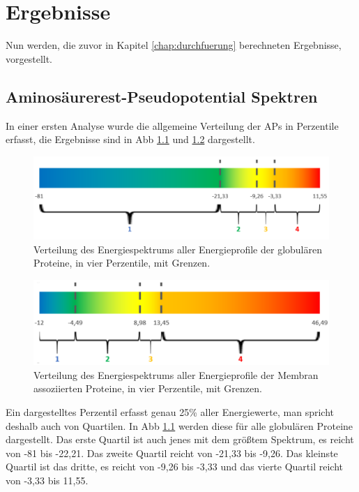 \chapter{Ergebnisse}
\label{chap:ergebnisse}

Nun werden, die zuvor in Kapitel \ref{chap:durchfuerung} berechneten Ergebnisse, vorgestellt.


\section{Aminosäurerest-Pseudopotential Spektren}

In einer ersten Analyse wurde die allgemeine Verteilung der \ac{APs} in Perzentile erfasst, die Ergebnisse sind in \ac{Abb} \ref{fig:quartiles_glob} und \ref{fig:quartiles_memb} dargestellt. 

\begin{figure}
\centering
\includegraphics[width=.95\textwidth]{images/Quartil_glob.png}
\caption{Verteilung des Energiespektrums aller Energieprofile der globulären Proteine, in vier Perzentile, mit Grenzen.}
\label{fig:quartiles_glob}
\end{figure}

\begin{figure}
\centering
\includegraphics[width=.95\textwidth]{images/Quartil_memb.png}
\caption{Verteilung des Energiespektrums aller Energieprofile der Membran assoziierten Proteine, in vier Perzentile, mit Grenzen.}
\label{fig:quartiles_memb}
\end{figure}


Ein dargestelltes Perzentil erfasst genau 25\% aller Energiewerte, man spricht deshalb auch von Quartilen. In \ac{Abb} \ref{fig:quartiles_glob} werden diese für alle globulären Proteine dargestellt. Das erste Quartil ist auch jenes mit dem größtem Spektrum, es reicht von -81 bis -22,21. Das zweite Quartil reicht von -21,33 bis -9,26. Das kleinste Quartil ist das dritte, es reicht von -9,26 bis -3,33 und das vierte Quartil reicht von -3,33 bis 11,55. 

